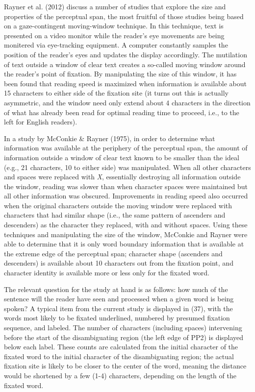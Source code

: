 \documentclass[11pt,oneside]{book}
\begin{document}
Rayner et al. (2012) discuss a number of studies that explore the size and properties of the perceptual span, the most fruitful of those studies being based on a gaze-contingent moving-window technique. In this technique, text is presented on a video monitor while the reader's eye movements are being monitered via eye-tracking equipment. A computer constantly samples the position of the reader's eyes and updates the display accordingly. The mutilation of text outside a window of clear text creates a so-called moving window around the reader's point of fixation. By manipulating the size of this window, it has been found that reading speed is maximized when information is available about 15 characters to either side of the fixation site (it turns out this is actually asymmetric, and the window need only extend about 4 characters in the direction of what has already been read for optimal reading time to proceed, i.e., to the left for English readers).

In a study by McConkie \& Rayner (1975), in order to determine what information was available at the periphery of the perceptual span, the amount of information outside a window of clear text known to be smaller than the ideal (e.g., 21 characters, 10 to either side) was manipulated. When all other characters and spaces were replaced with \emph{X}, essentially destroying all information outside the window, reading was slower than when character spaces were maintained but all other information was obscured. Improvements in reading speed also occurred when the original characters outside the moving window were replaced with characters that had similar shape (i.e., the same pattern of ascenders and descenders) as the character they replaced, with and without spaces. Using these techniques and manipulating the size of the window, McConkie and Rayner were able to determine that it is only word boundary information that is available at the extreme edge of the perceptual span; character shape (ascenders and descenders) is available about 10 characters out from the fixation point, and character identity is available more or less only for the fixated word.

The relevant question for the study at hand is as follows: how much of the sentence will the reader have seen and processed when a given word is being spoken? A typical item from the current study is displayed in (37), with the words most likely to be fixated underlined, numbered by presumed fixation sequence, and labeled. The number of characters (including spaces) intervening before the start of the disambiguating region (the left edge of PP2) is displayed below each label. These counts are calculated from the initial character of the fixated word to the initial character of the disambiguating region; the actual fixation site is likely to be closer to the center of the word, meaning the distance would be shortened by a few (1-4) characters, depending on the length of the fixated word.
\end{document}
